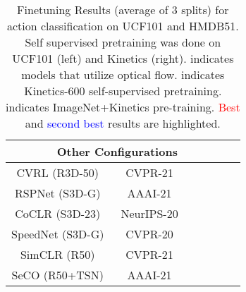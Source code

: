 \documentclass[10pt,twocolumn,letterpaper]{article}
\newcommand{\grayedout}[1]{{\color{gray}  #1}}
\begin{document}
\begin{table*}
\begin{center}
\begin{tabular}{ccccccc}
\hline
\multicolumn{6}{c}{\textbf{Other Configurations}}\\
\hline
\grayedout{CVRL (R3D-50)~\cite{cvrl}} & \grayedout{CVPR-21} & \grayedout{} &      &   & \grayedout{} & \grayedout{}   \\
\grayedout{RSPNet (S3D-G)~\cite{rspnet}} & \grayedout{AAAI-21} & \grayedout{} &      &   & \grayedout{} & \grayedout{}   \\
\grayedout{CoCLR\textsuperscript{\textdagger} (S3D-23)~\cite{cotraining}} & \grayedout{NeurIPS-20} & \grayedout{} & \grayedout{} & \grayedout{} & \grayedout{} & \grayedout{}\\
\grayedout{SpeedNet (S3D-G)~\cite{speedNet}} & \grayedout{CVPR-20} & \grayedout{} &  &  & \grayedout{} & \grayedout{}\\
\grayedout{SimCLR (R50)~\cite{Feichtenhofer_2021_CVPR}} & \grayedout{CVPR-21} & \grayedout{} & \grayedout{} & \grayedout{} & \grayedout{} & \grayedout{}\\
\grayedout{SeCO (R50+TSN)~\cite{seco}} & \grayedout{AAAI-21} & \grayedout{} &  &  & \grayedout{} & \grayedout{}\\
\hline
\end{tabular}
\end{center}
\caption{Finetuning Results (average of 3 splits) for action classification on UCF101 and HMDB51. Self supervised pretraining  was done on UCF101 (left) and Kinetics (right). \textsuperscript{\textdagger} indicates models that utilize optical flow.  indicates Kinetics-600 self-supervised pretraining.  indicates ImageNet+Kinetics pre-training. \textcolor{red}{Best} and \textcolor{blue}{second best} results are highlighted.}
\label{tab:finetuning-results}
\end{table*}
\end{document}

